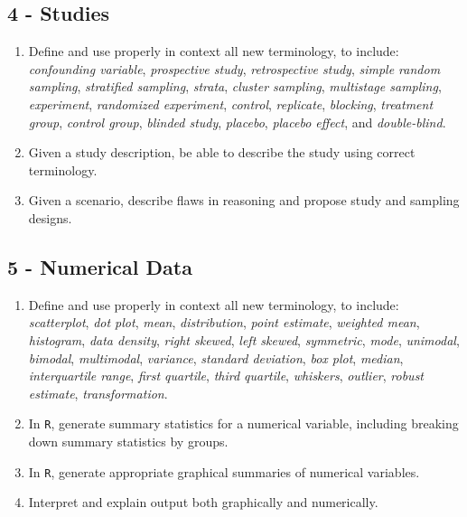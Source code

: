 \documentclass[
  letterpaper,
  DIV=11,
  numbers=noendperiod]{scrreprt}
\begin{document}
\subsection*{4 - Studies}\label{studies}

\begin{enumerate}
\def\labelenumi{\arabic{enumi})}
\item
  Define and use properly in context all new terminology, to include:
  \emph{confounding variable}, \emph{prospective study},
  \emph{retrospective study}, \emph{simple random sampling},
  \emph{stratified sampling}, \emph{strata}, \emph{cluster sampling},
  \emph{multistage sampling}, \emph{experiment}, \emph{randomized
  experiment}, \emph{control}, \emph{replicate}, \emph{blocking},
  \emph{treatment group}, \emph{control group}, \emph{blinded study},
  \emph{placebo}, \emph{placebo effect}, and \emph{double-blind}.
\item
  Given a study description, be able to describe the study using correct
  terminology.
\item
  Given a scenario, describe flaws in reasoning and propose study and
  sampling designs.
\end{enumerate}

\subsection*{5 - Numerical Data}\label{numerical-data}

\begin{enumerate}
\def\labelenumi{\arabic{enumi})}
\item
  Define and use properly in context all new terminology, to include:
  \emph{scatterplot}, \emph{dot plot}, \emph{mean}, \emph{distribution},
  \emph{point estimate}, \emph{weighted mean}, \emph{histogram},
  \emph{data density}, \emph{right skewed}, \emph{left skewed},
  \emph{symmetric}, \emph{mode}, \emph{unimodal}, \emph{bimodal},
  \emph{multimodal}, \emph{variance}, \emph{standard deviation},
  \emph{box plot}, \emph{median}, \emph{interquartile range},
  \emph{first quartile}, \emph{third quartile}, \emph{whiskers},
  \emph{outlier}, \emph{robust estimate}, \emph{transformation}.
\item
  In \texttt{R}, generate summary statistics for a numerical variable,
  including breaking down summary statistics by groups.
\item
  In \texttt{R}, generate appropriate graphical summaries of numerical
  variables.
\item
  Interpret and explain output both graphically and numerically.
\end{enumerate}
\end{document}
